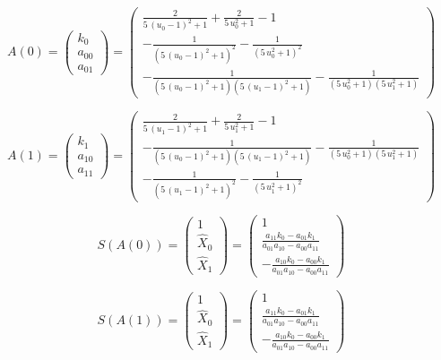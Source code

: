 \documentclass{article}
\begin{document}
\[
  A\left(0\right) = \left(\begin{array}{c}
  k_{0}\\
  a_{00}\\
  a_{01}
\end{array}\right) = \left(\begin{array}{c}
  \frac{2}{5 \, {\left(u_{0} - 1\right)}^{2} + 1} + \frac{2}{5 \, u_{0}^{2} + 1} - 1\\
  -\frac{1}{{\left(5 \, {\left(u_{0} - 1\right)}^{2} + 1\right)}^{2}} - \frac{1}{{\left(5 \, u_{0}^{2} + 1\right)}^{2}}\\
  -\frac{1}{{\left(5 \, {\left(u_{0} - 1\right)}^{2} + 1\right)} {\left(5 \, {\left(u_{1} - 1\right)}^{2} + 1\right)}} - \frac{1}{{\left(5 \, u_{0}^{2} + 1\right)} {\left(5 \, u_{1}^{2} + 1\right)}}
\end{array}\right)
\]

\[
  A\left(1\right) = \left(\begin{array}{c}
  k_{1}\\
  a_{10}\\
  a_{11}
\end{array}\right) = \left(\begin{array}{c}
  \frac{2}{5 \, {\left(u_{1} - 1\right)}^{2} + 1} + \frac{2}{5 \, u_{1}^{2} + 1} - 1\\
  -\frac{1}{{\left(5 \, {\left(u_{0} - 1\right)}^{2} + 1\right)} {\left(5 \, {\left(u_{1} - 1\right)}^{2} + 1\right)}} - \frac{1}{{\left(5 \, u_{0}^{2} + 1\right)} {\left(5 \, u_{1}^{2} + 1\right)}}\\
  -\frac{1}{{\left(5 \, {\left(u_{1} - 1\right)}^{2} + 1\right)}^{2}} - \frac{1}{{\left(5 \, u_{1}^{2} + 1\right)}^{2}}
\end{array}\right)
\]

\[
  S\left(A\left(0\right)\right) = \left(\begin{array}{c}
  1\\
  \hat{X}_{0}\\
  \hat{X}_{1}
\end{array}\right) = \left(\begin{array}{c}
  1\\
  \frac{a_{11} k_{0} - a_{01} k_{1}}{a_{01} a_{10} - a_{00} a_{11}}\\
  -\frac{a_{10} k_{0} - a_{00} k_{1}}{a_{01} a_{10} - a_{00} a_{11}}
\end{array}\right)
\]

\[
  S\left(A\left(1\right)\right) = \left(\begin{array}{c}
  1\\
  \hat{X}_{0}\\
  \hat{X}_{1}
\end{array}\right) = \left(\begin{array}{c}
  1\\
  \frac{a_{11} k_{0} - a_{01} k_{1}}{a_{01} a_{10} - a_{00} a_{11}}\\
  -\frac{a_{10} k_{0} - a_{00} k_{1}}{a_{01} a_{10} - a_{00} a_{11}}
\end{array}\right)
\]
\end{document}
